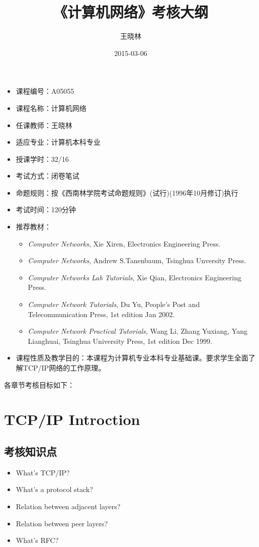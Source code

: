 \documentclass[11pt]{article}
\author{王晓林}
\date{2015-03-06}
\title{《计算机网络》考核大纲}
\begin{document}
\maketitle
\tableofcontents


\begin{itemize}
\item 课程编号：A05055
\item 课程名称：计算机网络
\item 任课教师：王晓林
\item 适应专业：计算机本科专业
\item 授课学时：32/16
\item 考试方式：闭卷笔试
\item 命题规则：按《西南林学院考试命题规则》(试行)(1996年10月修订)执行
\item 考试时间：120分钟
\item 推荐教材：
\begin{itemize}
\item \emph{Computer Networks}, Xie Xiren, Electronics Engineering Press.
\item \emph{Computer Networks}, Andrew S.Tanenbaum, Tsinghua Unversity Press.
\item \emph{Computer Networks Lab Tutorials}, Xie Qian, Electronics Engineering Press.
\item \emph{Computer Network Tutorials}, Du Yu, People's Post and
Telecommunication Press, 1st edition Jan 2002.
\item \emph{Computer Network Practical Tutorials}, Wang Li, Zhang Yuxiang,
Yang Lianghuai, Tsinghua University Press, 1st edition Dec 1999.
\end{itemize}
\item 课程性质及教学目的：本课程为计算机专业本科专业基础课。要求学生全面了解TCP/IP网络的工作原理。
\end{itemize}

各章节考核目标如下：
\section{TCP/IP Introction}
\label{sec-1}
\subsection{考核知识点}
\label{sec-1-1}
\begin{itemize}
\item What's TCP/IP?
\item What's a protocol stack?
\item Relation between adjacent layers?
\item Relation between peer layers?
\item What's RFC?
\end{itemize}
\end{document}
